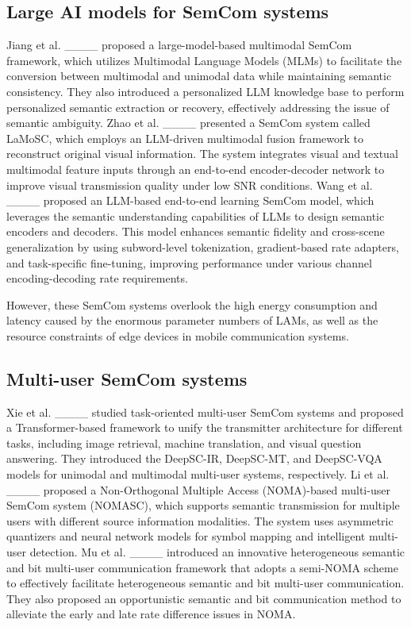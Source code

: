 \subsection{Large AI models for SemCom systems}
Jiang et al. ____ proposed a large-model-based multimodal SemCom framework, which utilizes Multimodal Language Models (MLMs) to facilitate the conversion between multimodal and unimodal data while maintaining semantic consistency. They also introduced a personalized LLM knowledge base to perform personalized semantic extraction or recovery, effectively addressing the issue of semantic ambiguity. 
Zhao et al. ____ presented a SemCom system called LaMoSC, which employs an LLM-driven multimodal fusion framework to reconstruct original visual information. The system integrates visual and textual multimodal feature inputs through an end-to-end encoder-decoder network to improve visual transmission quality under low SNR conditions. 
Wang et al. ____ proposed an LLM-based end-to-end learning SemCom model, which leverages the semantic understanding capabilities of LLMs to design semantic encoders and decoders. This model enhances semantic fidelity and cross-scene generalization by using subword-level tokenization, gradient-based rate adapters, and task-specific fine-tuning, improving performance under various channel encoding-decoding rate requirements.

However, these SemCom systems overlook the high energy consumption and latency caused by the enormous parameter numbers of LAMs, as well as the resource constraints of edge devices in mobile communication systems.

\subsection{Multi-user SemCom systems}
Xie et al. ____ studied task-oriented multi-user SemCom systems and proposed a Transformer-based framework to unify the transmitter architecture for different tasks, including image retrieval, machine translation, and visual question answering. They introduced the DeepSC-IR, DeepSC-MT, and DeepSC-VQA models for unimodal and multimodal multi-user systems, respectively. 
Li et al. ____ proposed a Non-Orthogonal Multiple Access (NOMA)-based multi-user SemCom system (NOMASC), which supports semantic transmission for multiple users with different source information modalities. The system uses asymmetric quantizers and neural network models for symbol mapping and intelligent multi-user detection. 
Mu et al. ____ introduced an innovative heterogeneous semantic and bit multi-user communication framework that adopts a semi-NOMA scheme to effectively facilitate heterogeneous semantic and bit multi-user communication. They also proposed an opportunistic semantic and bit communication method to alleviate the early and late rate difference issues in NOMA.

